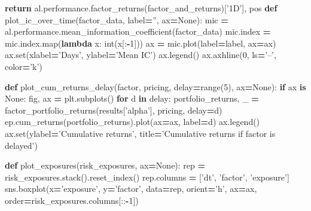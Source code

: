 \documentclass[11,]{article}
\newenvironment{Shaded}{\begin{snugshade}}{\end{snugshade}}
\newcommand{\BuiltInTok}[1]{#1}
\newcommand{\ControlFlowTok}[1]{\textcolor[rgb]{0.13,0.29,0.53}{\textbf{#1}}}
\newcommand{\DecValTok}[1]{\textcolor[rgb]{0.00,0.00,0.81}{#1}}
\newcommand{\KeywordTok}[1]{\textcolor[rgb]{0.13,0.29,0.53}{\textbf{#1}}}
\newcommand{\NormalTok}[1]{#1}
\newcommand{\OperatorTok}[1]{\textcolor[rgb]{0.81,0.36,0.00}{\textbf{#1}}}
\newcommand{\StringTok}[1]{\textcolor[rgb]{0.31,0.60,0.02}{#1}}
\newcommand{\VariableTok}[1]{\textcolor[rgb]{0.00,0.00,0.00}{#1}}
\begin{document}
\begin{Shaded}
\begin{Highlighting}[]
    \ControlFlowTok{return}\NormalTok{ al.performance.factor_returns(factor_and_returns)[}\StringTok{'1D'}\NormalTok{], pos}
\KeywordTok{def}\NormalTok{ plot_ic_over_time(factor_data, label}\OperatorTok{=}\StringTok{''}\NormalTok{, ax}\OperatorTok{=}\VariableTok{None}\NormalTok{):}
\NormalTok{    mic }\OperatorTok{=}\NormalTok{ al.performance.mean_information_coefficient(factor_data)}
\NormalTok{    mic.index }\OperatorTok{=}\NormalTok{ mic.index.}\BuiltInTok{map}\NormalTok{(}\KeywordTok{lambda}\NormalTok{ x: }\BuiltInTok{int}\NormalTok{(x[:}\OperatorTok{-}\DecValTok{1}\NormalTok{])) }
\NormalTok{    ax }\OperatorTok{=}\NormalTok{ mic.plot(label}\OperatorTok{=}\NormalTok{label, ax}\OperatorTok{=}\NormalTok{ax)}
\NormalTok{    ax.}\BuiltInTok{set}\NormalTok{(xlabel}\OperatorTok{=}\StringTok{'Days'}\NormalTok{, ylabel}\OperatorTok{=}\StringTok{'Mean IC'}\NormalTok{)}
\NormalTok{    ax.legend()}
\NormalTok{    ax.axhline(}\DecValTok{0}\NormalTok{, ls}\OperatorTok{=}\StringTok{'--'}\NormalTok{, color}\OperatorTok{=}\StringTok{'k'}\NormalTok{)}
    
\KeywordTok{def}\NormalTok{ plot_cum_returns_delay(factor, pricing, delay}\OperatorTok{=}\BuiltInTok{range}\NormalTok{(}\DecValTok{5}\NormalTok{), ax}\OperatorTok{=}\VariableTok{None}\NormalTok{):}
    \ControlFlowTok{if}\NormalTok{ ax }\KeywordTok{is} \VariableTok{None}\NormalTok{:}
\NormalTok{        fig, ax }\OperatorTok{=}\NormalTok{ plt.subplots()}
    \ControlFlowTok{for}\NormalTok{ d }\KeywordTok{in}\NormalTok{ delay:}
\NormalTok{        portfolio_returns, _ }\OperatorTok{=}\NormalTok{ factor_portfolio_returns(results[}\StringTok{'alpha'}\NormalTok{], pricing, delay}\OperatorTok{=}\NormalTok{d)}
\NormalTok{        ep.cum_returns(portfolio_returns).plot(ax}\OperatorTok{=}\NormalTok{ax, label}\OperatorTok{=}\NormalTok{d)}
\NormalTok{    ax.legend()}
\NormalTok{    ax.}\BuiltInTok{set}\NormalTok{(ylabel}\OperatorTok{=}\StringTok{'Cumulative returns'}\NormalTok{, title}\OperatorTok{=}\StringTok{'Cumulative returns if factor is delayed'}\NormalTok{)}
    
\KeywordTok{def}\NormalTok{ plot_exposures(risk_exposures, ax}\OperatorTok{=}\VariableTok{None}\NormalTok{):}
\NormalTok{    rep }\OperatorTok{=}\NormalTok{ risk_exposures.stack().reset_index()}
\NormalTok{    rep.columns }\OperatorTok{=}\NormalTok{ [}\StringTok{'dt'}\NormalTok{, }\StringTok{'factor'}\NormalTok{, }\StringTok{'exposure'}\NormalTok{]}
\NormalTok{    sns.boxplot(x}\OperatorTok{=}\StringTok{'exposure'}\NormalTok{, y}\OperatorTok{=}\StringTok{'factor'}\NormalTok{, data}\OperatorTok{=}\NormalTok{rep, orient}\OperatorTok{=}\StringTok{'h'}\NormalTok{, ax}\OperatorTok{=}\NormalTok{ax, order}\OperatorTok{=}\NormalTok{risk_exposures.columns[::}\OperatorTok{-}\DecValTok{1}\NormalTok{])}
    

\end{Highlighting}
\end{Shaded}
\end{document}
